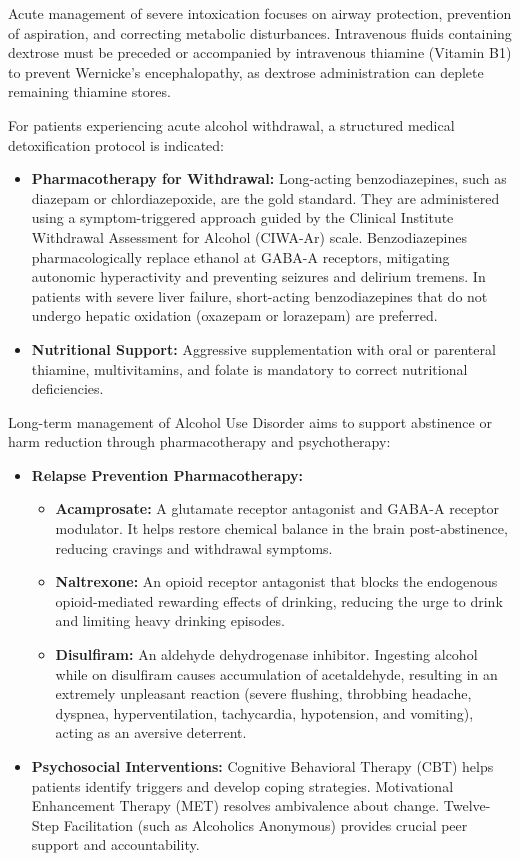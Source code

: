 Acute management of severe intoxication focuses on airway protection, prevention of aspiration, and correcting metabolic disturbances. Intravenous fluids containing dextrose must be preceded or accompanied by intravenous thiamine (Vitamin B1) to prevent Wernicke's encephalopathy, as dextrose administration can deplete remaining thiamine stores.

For patients experiencing acute alcohol withdrawal, a structured medical detoxification protocol is indicated:
\begin{itemize}
    \item \textbf{Pharmacotherapy for Withdrawal:} Long-acting benzodiazepines, such as diazepam or chlordiazepoxide, are the gold standard. They are administered using a symptom-triggered approach guided by the Clinical Institute Withdrawal Assessment for Alcohol (CIWA-Ar) scale. Benzodiazepines pharmacologically replace ethanol at GABA-A receptors, mitigating autonomic hyperactivity and preventing seizures and delirium tremens. In patients with severe liver failure, short-acting benzodiazepines that do not undergo hepatic oxidation (oxazepam or lorazepam) are preferred.
    \item \textbf{Nutritional Support:} Aggressive supplementation with oral or parenteral thiamine, multivitamins, and folate is mandatory to correct nutritional deficiencies.
\end{itemize}

Long-term management of Alcohol Use Disorder aims to support abstinence or harm reduction through pharmacotherapy and psychotherapy:
\begin{itemize}
    \item \textbf{Relapse Prevention Pharmacotherapy:}
        \begin{itemize}
            \item \textbf{Acamprosate:} A glutamate receptor antagonist and GABA-A receptor modulator. It helps restore chemical balance in the brain post-abstinence, reducing cravings and withdrawal symptoms.
            \item \textbf{Naltrexone:} An opioid receptor antagonist that blocks the endogenous opioid-mediated rewarding effects of drinking, reducing the urge to drink and limiting heavy drinking episodes.
            \item \textbf{Disulfiram:} An aldehyde dehydrogenase inhibitor. Ingesting alcohol while on disulfiram causes accumulation of acetaldehyde, resulting in an extremely unpleasant reaction (severe flushing, throbbing headache, dyspnea, hyperventilation, tachycardia, hypotension, and vomiting), acting as an aversive deterrent.
        \end{itemize}
    \item \textbf{Psychosocial Interventions:} Cognitive Behavioral Therapy (CBT) helps patients identify triggers and develop coping strategies. Motivational Enhancement Therapy (MET) resolves ambivalence about change. Twelve-Step Facilitation (such as Alcoholics Anonymous) provides crucial peer support and accountability.
\end{itemize}

